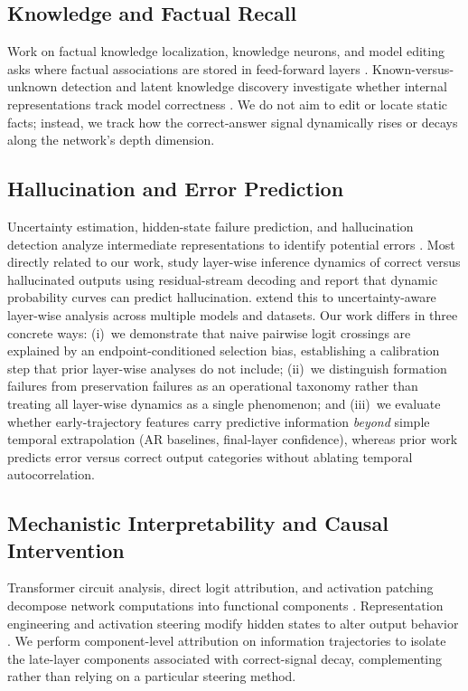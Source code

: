 \documentclass{article} %
\begin{document}
\subsection{Knowledge and Factual Recall}
Work on factual knowledge localization, knowledge neurons, and model editing asks where factual associations are stored in feed-forward layers \citep{geva2021transformer, dai2022knowledge, meng2022rome, meng2023memit, geva2023dissecting}. Known-versus-unknown detection and latent knowledge discovery investigate whether internal representations track model correctness \citep{kadavath2022language, burns2022discovering, azaria2023internal, yin2023do, li2024inference}. We do not aim to edit or locate static facts; instead, we track how the correct-answer signal dynamically rises or decays along the network's depth dimension.

\subsection{Hallucination and Error Prediction}
Uncertainty estimation, hidden-state failure prediction, and hallucination detection analyze intermediate representations to identify potential errors \citep{schuster2022confident, kuhn2023semantic, azaria2023internal, manakul2023selfcheckgpt}. Most directly related to our work, \citet{jiang2024hallucination} study layer-wise inference dynamics of correct versus hallucinated outputs using residual-stream decoding and report that dynamic probability curves can predict hallucination. \citet{kim2025uncertainty} extend this to uncertainty-aware layer-wise analysis across multiple models and datasets. Our work differs in three concrete ways: (i)~we demonstrate that naive pairwise logit crossings are explained by an endpoint-conditioned selection bias, establishing a calibration step that prior layer-wise analyses do not include; (ii)~we distinguish formation failures from preservation failures as an operational taxonomy rather than treating all layer-wise dynamics as a single phenomenon; and (iii)~we evaluate whether early-trajectory features carry predictive information \emph{beyond} simple temporal extrapolation (AR baselines, final-layer confidence), whereas prior work predicts error versus correct output categories without ablating temporal autocorrelation.

\subsection{Mechanistic Interpretability and Causal Intervention}
Transformer circuit analysis, direct logit attribution, and activation patching decompose network computations into functional components \citep{elhage2021mathematical, olsson2022incontext, wang2022interpretability, nanda2023progress}. Representation engineering and activation steering modify hidden states to alter output behavior \citep{turner2023activation, rimsky2023steering, zou2023representation}. We perform component-level attribution on information trajectories to isolate the late-layer components associated with correct-signal decay, complementing rather than relying on a particular steering method.
\end{document}
